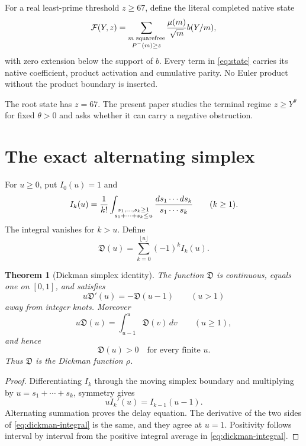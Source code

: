 \documentclass[11pt]{article}
\newtheorem{theorem}{Theorem}[section]
\newcommand{\Fcal}{\mathcal F}
\newcommand{\Dcal}{\mathfrak D}
\begin{document}
For a real least-prime threshold $z\ge67$, define the literal completed native
state
\begin{equation}\label{eq:state}
 \Fcal(Y,z)=
 \sum_{\substack{m\text{ squarefree}\\P^-(m)\ge z}}
 {\mu(m)\over\sqrt m}b(Y/m),
\end{equation}
with zero extension below the support of $b$.  Every term in
\eqref{eq:state} carries its native coefficient, product activation and
cumulative parity.  No Euler product without the product boundary is inserted.

The root state has $z=67$.  The present paper studies the terminal regime
$z\ge Y^\theta$ for fixed $\theta>0$ and asks whether it can carry a negative
obstruction.

\section{The exact alternating simplex}

For $u\ge0$, put $I_0(u)=1$ and
\begin{equation}\label{eq:Ik}
 I_k(u)={1\over k!}
 \int_{\substack{s_1,\ldots,s_k\ge1\\s_1+\cdots+s_k\le u}}
 {ds_1\cdots ds_k\over s_1\cdots s_k}
 \qquad(k\ge1).
\end{equation}
The integral vanishes for $k>u$.  Define
\begin{equation}\label{eq:D}
 \Dcal(u)=\sum_{k=0}^{\lfloor u\rfloor}(-1)^kI_k(u).
\end{equation}

\begin{theorem}[Dickman simplex identity]\label{thm:dickman}
The function $\Dcal$ is continuous, equals one on $[0,1]$, and satisfies
\[
 u\Dcal'(u)=-\Dcal(u-1)
 \qquad(u>1)
\]
away from integer knots.  Moreover
\begin{equation}\label{eq:dickman-integral}
 \boxed{u\Dcal(u)=\int_{u-1}^{u}\Dcal(v)\,dv}
 \qquad(u\ge1),
\end{equation}
and hence
\begin{equation}\label{eq:dickman-positive}
 \boxed{\Dcal(u)>0\quad\text{for every finite }u.}
\end{equation}
Thus $\Dcal$ is the Dickman function $\rho$.
\end{theorem}

\begin{proof}
Differentiating $I_k$ through the moving simplex boundary and multiplying by
$u=s_1+\cdots+s_k$, symmetry gives
\[
 uI_k'(u)=I_{k-1}(u-1).
\]
Alternating summation proves the delay equation.  The derivative of the two
sides of \eqref{eq:dickman-integral} is the same, and they agree at $u=1$.
Positivity follows interval by interval from the positive integral average in
\eqref{eq:dickman-integral}.
\end{proof}
\end{document}
